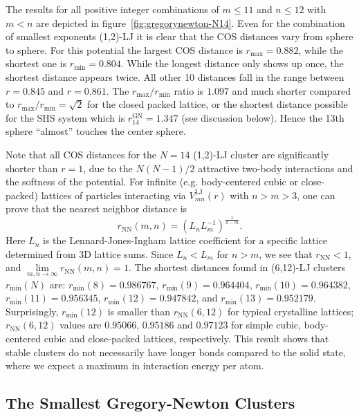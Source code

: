 The results for all positive integer combinations of $m\leq11$ and $n\leq12$
with $m<n$ are depicted in figure~\ref{fig:gregorynewton-N14}. Even for the
combination of smallest exponents (1,2)-\ac{LJ} it is clear that the \ac{COS}
distances vary from sphere to sphere. For this potential the largest \ac{COS}
distance is $r_\text{max}=0.882$, while the shortest one is
$r_\text{min}=0.804$. While the longest distance only shows up once, the
shortest distance appears twice. All other 10 distances fall in the range
between $r = 0.845$ and $r = 0.861$. The $r_\text{max} /r_\text{min}$ ratio is
$1.097$ and much shorter compared to $r_\text{max} /r_\text{min}= \sqrt{2}$ for
the closed packed lattice, or the shortest distance possible for the \ac{SHS}
system which is $r_{14}^\text{GN} = 1.347$ (see discussion below). Hence the
13th sphere ``almost'' touches the center sphere.

Note that all \ac{COS} distances for the $N=14$ (1,2)-\ac{LJ} cluster are
significantly shorter than $r=1$, due to the $N(N-1)/2$ attractive two-body
interactions and the softness of the potential.  For infinite (e.g.
body-centered cubic or close-packed) lattices of particles interacting via
$V^\mathrm{LJ}_{mn}(r)$ with $n> m >3$, one can prove
\autocite{Schwerdtfeger_ExtensionLennardJonespotential_2006} that the nearest neighbor distance is
%
\begin{equation}
    r_\mathrm{NN}(m,n)=\left( L_n L_m^{-1}\right)^\frac{1}{n-m}. %
    \label{eqn:lattice}
\end{equation}%
%
Here $L_n$ is the Lennard-Jones-Ingham lattice coefficient for a specific
lattice determined from 3D lattice sums.  Since $L_n<L_m$ for $n>m$, we see
that $r_\mathrm{NN}<1$, and $\lim\limits_{m,n\rightarrow
\infty}r_\mathrm{NN}(m,n)=1$.  The shortest distances found in (6,12)-\ac{LJ}
clusters $r_\text{min}(N)$ are: $r_\text{min}(8)=0.986767$,
$r_\text{min}(9)=0.964404$, $r_\text{min}(10)=0.964382$,
$r_\text{min}(11)=0.956345$, $r_\text{min}(12)=0.947842$, and
$r_\text{min}(13)=0.952179$.  Surprisingly, $r_\text{min}(12)$ is smaller than
$r_\mathrm{NN}(6,12)$ for typical crystalline lattices; $r_\mathrm{NN}(6,12)$
values are $0.95066$, $0.95186$ and $0.97123$ for simple cubic, body-centered
cubic and close-packed lattices, respectively.  This result shows that stable
clusters do not necessarily have longer bonds compared to the solid state,
where we expect a maximum in interaction energy per atom.


\subsection{The Smallest Gregory-Newton Clusters}
\label{sec:themsmallestgregorynewtonclusters}


